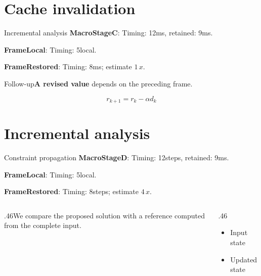 \documentclass[10pt,aspectratio=43]{beamer}
\newcommand{\fuzzlayerA}[1]{\textbf{#1}}
\newcommand{\fuzzlayerB}[1]{\fuzzlayerA{#1}}
\newcommand{\fuzzlayerC}[1]{\fuzzlayerB{#1}}
\newcommand{\fuzzterm}[1]{\fuzzlayerC{#1}}
\newcommand{\fuzzpair}[2]{\fuzzterm{#1}: #2}
\newcommand{\fuzzunit}{ms}
\let\fuzzoriginalunit\fuzzunit
\newcommand{\fuzzcoefficient}{1}
\newcommand{\fuzzscale}[2][\fuzzcoefficient]{#1\,#2}
\begin{document}
\section{Cache invalidation}
\begin{frame}[t]{Incremental analysis}
\fuzzpair{MacroStageC}{Timing: 12\fuzzunit, retained: 9\fuzzoriginalunit.}\par
{\renewcommand{\fuzzunit}{local}\fuzzpair{FrameLocal}{Timing: 5\fuzzunit.}\par}
\fuzzpair{FrameRestored}{Timing: 8\fuzzunit; estimate $\fuzzscale{x}$.}\par
\begin{block}{Follow-up}\fuzzterm{A revised value} depends on the preceding frame.\end{block}
\[r_{k+1}=r_k-\alpha d_k\]
\end{frame}
\renewcommand{\fuzzunit}{steps}
\renewcommand{\fuzzcoefficient}{4}
\renewcommand{\fuzzterm}[1]{{\textbf{#1}}}
\section{Incremental analysis}
\begin{frame}[t]{Constraint propagation}
\fuzzpair{MacroStageD}{Timing: 12\fuzzunit, retained: 9\fuzzoriginalunit.}\par
{\renewcommand{\fuzzunit}{local}\fuzzpair{FrameLocal}{Timing: 5\fuzzunit.}\par}
\fuzzpair{FrameRestored}{Timing: 8\fuzzunit; estimate $\fuzzscale{x}$.}\par
\begin{columns}[T]\begin{column}{.46\textwidth}We compare the proposed solution with a reference computed from the complete input.\end{column}\begin{column}{.46\textwidth}\begin{itemize}\item Input state\item Updated state\end{itemize}\end{column}\end{columns}
\end{frame}
\end{document}
